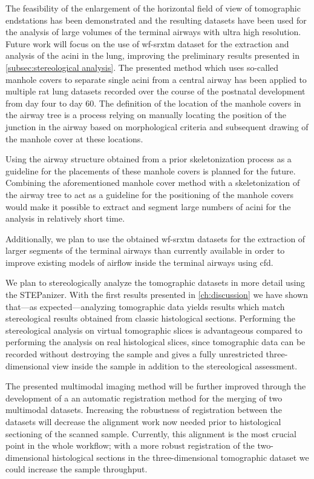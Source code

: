 The feasibility of the enlargement of the horizontal field of view of tomographic endstations has been demonstrated and the resulting datasets have been used for the analysis of large volumes of the terminal airways with ultra high resolution. Future work will focus on the use of \ac{wf-srxtm} dataset for the extraction and analysis of the acini in the lung, improving the preliminary results presented in \autoref{subsec:stereological analysis}. The presented method which uses so-called manhole covers to separate single acini from a central airway has been applied to multiple rat lung datasets recorded over the course of the postnatal development from day four to day 60. The definition of the location of the manhole covers in the airway tree is a process relying on manually locating the position of the junction in the airway based on morphological criteria and subsequent drawing of the manhole cover at these locations.

Using the airway structure obtained from a prior skeletonization process as a guideline for the placements of these manhole covers is planned for the future. Combining the aforementioned manhole cover method with a skeletonization of the airway tree to act as a guideline for the positioning of the manhole covers would make it possible to extract and segment large numbers of acini for the analysis in relatively short time.

Additionally, we plan to use the obtained \ac{wf-srxtm} datasets for the extraction of larger segments of the terminal airways than currently available in order to improve existing models of airflow inside the terminal airways \cite{Sznitman2007,Sznitman2009} using \ac{cfd}. 

We plan to stereologically analyze the tomographic datasets in more detail using the STEPanizer. With the first results presented in \autoref{ch:discussion} we have shown that---as expected---analyzing tomographic data yields results which match stereological results obtained from classic histological sections. Performing the stereological analysis on virtual tomographic slices is advantageous compared to performing the analysis on real histological slices, since tomographic data can be recorded without destroying the sample and gives a fully unrestricted three-dimensional view inside the sample in addition to the stereological assessment.

The presented multimodal imaging method will be further improved through the development of a an automatic registration method for the merging of two multimodal datasets. Increasing the robustness of registration between the datasets will decrease the alignment work now needed prior to histological sectioning of the scanned sample. Currently, this alignment is the most crucial point in the whole workflow; with a more robust registration of the two-dimensional histological sections in the three-dimensional tomographic dataset we could increase the sample throughput.

